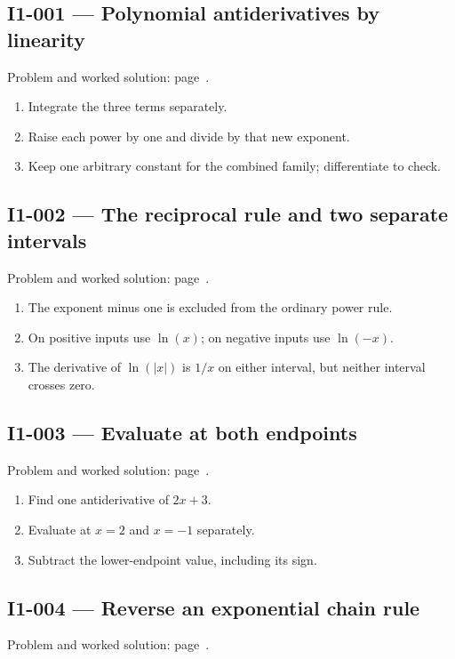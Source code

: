 \documentclass[11pt,oneside,openany]{book}
\begin{document}
\subsection*{I1-001 --- Polynomial antiderivatives by linearity}
\label{hints:I1-001}
Problem and worked solution: page~\pageref{problem:I1-001}.

\begin{enumerate}
\item Integrate the three terms separately.
\item Raise each power by one and divide by that new exponent.
\item Keep one arbitrary constant for the combined family; differentiate to check.
\end{enumerate}
\subsection*{I1-002 --- The reciprocal rule and two separate intervals}
\label{hints:I1-002}
Problem and worked solution: page~\pageref{problem:I1-002}.

\begin{enumerate}
\item The exponent minus one is excluded from the ordinary power rule.
\item On positive inputs use \(\ln(x)\); on negative inputs use \(\ln(-x)\).
\item The derivative of \(\ln(|x|)\) is \(1/x\) on either interval, but neither interval crosses zero.
\end{enumerate}
\subsection*{I1-003 --- Evaluate at both endpoints}
\label{hints:I1-003}
Problem and worked solution: page~\pageref{problem:I1-003}.

\begin{enumerate}
\item Find one antiderivative of \(2x+3\).
\item Evaluate at \(x=2\) and \(x=-1\) separately.
\item Subtract the lower-endpoint value, including its sign.
\end{enumerate}
\subsection*{I1-004 --- Reverse an exponential chain rule}
\label{hints:I1-004}
Problem and worked solution: page~\pageref{problem:I1-004}.
\end{document}
